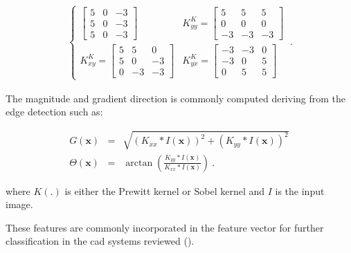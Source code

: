 \begin{enumerate}[leftmargin=*]
{\begin{eqnarray}
\begin{cases}
\begin{bmatrix}
	5 & 0 & -3 \\
	5 & 0 & -3 \\
	5 & 0 & -3
\end{bmatrix} & K_{yy}^{K} = \begin{bmatrix}
	5 & 5 & 5 \\
	0 & 0 & 0 \\
	-3 & -3 & -3
\end{bmatrix} \\
K_{xy}^{K} = \begin{bmatrix}
	5 & 5 & 0 \\
	5 & 0 & -3 \\
	0 & -3 & -3
\end{bmatrix} & K_{yx}^{K} = \begin{bmatrix}
	-3 & -3 & 0 \\
	-3 & 0 & 5 \\
	0 & 5 & 5
\end{bmatrix}
\end{cases} \ . \label{eq:kirsch}
\end{eqnarray}}%

The magnitude and gradient direction is commonly computed deriving from the edge detection such as:

\begin{eqnarray}
	G(\mathbf{x}) & = & \sqrt{( K_{xx} \ast I(\mathbf{x}) )^2 + ( K_{yy} \ast I(\mathbf{x}) )^2} \, \label{eq:magn} \\
	\Theta(\mathbf{x}) & = & \arctan \left( \frac{K_{yy} \ast I(\mathbf{x})}{ K_{xx} \ast I(\mathbf{x})}  \right) \ . \label{eq:orien}
\end{eqnarray}

\noindent where $K(.)$ is either the Prewitt kernel or Sobel kernel and $I$ is the input image.

These features are commonly incorporated in the feature vector for further classification in the \ac{cad} systems reviewed (\cite{Niaf2011,Niaf2012,Tiwari2009a,Tiwari2010,Tiwari2013,Viswanath2008,Viswanath2011}).


\end{enumerate}
